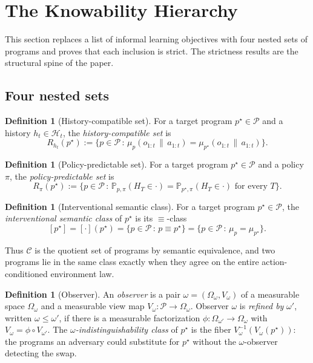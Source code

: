\documentclass[11pt]{article}
\theoremstyle{definition}
\newtheorem{definition}[theorem]{Definition}
\theoremstyle{remark}
\newcommand{\Ccal}{\mathcal{C}}
\newcommand{\Pcal}{\mathcal{P}}
\newcommand{\Hcal}{\mathcal{H}}
\newcommand{\Prob}{\mathbb{P}}
\newcommand{\givena}{\,\|\,}
\begin{document}
\section{The Knowability Hierarchy}
\label{sec:hierarchy}

This section replaces a list of informal learning objectives with four nested sets of programs and proves that each inclusion is strict. The strictness results are the structural spine of the paper.

\subsection{Four nested sets}

\begin{definition}[History-compatible set]
\label{def:history-compat}
For a target program $p^\star\in\Pcal$ and a history $h_t\in\Hcal_t$, the \emph{history-compatible set} is
\[
R_{h_t}(p^\star)
:=
\bigl\{p\in\Pcal\,:\,\mu_p(o_{1:t}\givena a_{1:t})=\mu_{p^\star}(o_{1:t}\givena a_{1:t})\bigr\}.
\]
\end{definition}

\begin{definition}[Policy-predictable set]
\label{def:policy-pred}
For a target program $p^\star\in\Pcal$ and a policy $\pi$, the \emph{policy-predictable set} is
\[
R_\pi(p^\star)
:=
\bigl\{p\in\Pcal\,:\,\Prob_{p,\pi}(H_T\in\cdot)=\Prob_{p^\star,\pi}(H_T\in\cdot)\text{ for every }T\bigr\}.
\]
\end{definition}

\begin{definition}[Interventional semantic class]
\label{def:int-sem-class}
For a target program $p^\star\in\Pcal$, the \emph{interventional semantic class} of $p^\star$ is its $\equiv$-class
\[
[p^\star]
=
[\cdot](p^\star)
=
\bigl\{p\in\Pcal\,:\,p\equiv p^\star\bigr\}
=
\bigl\{p\in\Pcal\,:\,\mu_p=\mu_{p^\star}\bigr\}.
\]
\end{definition}

Thus $\Ccal$ is the quotient set of programs by semantic equivalence, and two programs lie in the same class exactly when they agree on the entire action-conditioned environment law.

\begin{definition}[Observer]
\label{def:observer}
An \emph{observer} is a pair $\omega=(\Omega_\omega,V_\omega)$ of a measurable space $\Omega_\omega$ and a measurable view map $V_\omega:\Pcal\to\Omega_\omega$. Observer $\omega$ is \emph{refined by} $\omega'$, written $\omega\le\omega'$, if there is a measurable factorization $\phi:\Omega_{\omega'}\to\Omega_\omega$ with $V_\omega=\phi\circ V_{\omega'}$. The \emph{$\omega$-indistinguishability class} of $p^\star$ is the fiber $V_\omega^{-1}(V_\omega(p^\star))$: the programs an adversary could substitute for $p^\star$ without the $\omega$-observer detecting the swap.
\end{definition}
\end{document}
